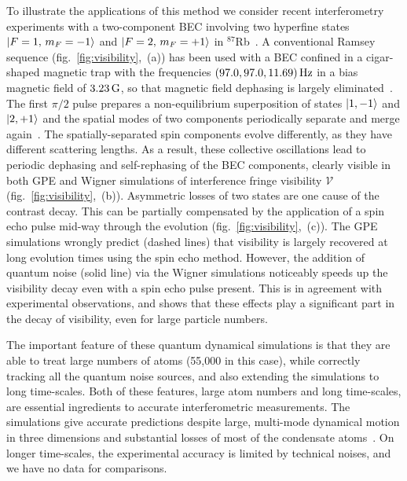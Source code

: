 \documentclass[doublecol]{epl2}
\newcommand{\Rb}{$^{87}$Rb}
\newcommand{\figref}[1]{fig.~\ref{#1}}
\newcommand{\ket}[1]{\mbox{\ensuremath{\vert #1 \rangle}}}
\begin{document}
To illustrate the applications of this method we consider recent interferometry
experiments with a two-component BEC involving two hyperfine states
${\ket{F=1,\, m_F=-1}}$ and ${\ket{F=2,\, m_F=+1}}$ in \Rb~\cite{Egorov2011}.
A conventional Ramsey sequence (\figref{fig:visibility},~(a)) has been used
with a BEC confined in a cigar-shaped magnetic trap with the frequencies $(97.0, 97.0, 11.69)\un{Hz}$
in a bias magnetic field of $3.23\un{G}$, so that magnetic field dephasing is largely eliminated~\cite{Hall1998}.
The first $\pi/2$ pulse prepares a non-equilibrium superposition of states ${\ket{1,-1}}$ and ${\ket{2,+1}}$
and the spatial modes of two components periodically separate and merge again~\cite{Mertes2007}.
The spatially-separated spin components evolve differently, as they have
different scattering lengths.
As a result, these collective oscillations lead to periodic dephasing and
self-rephasing of the BEC components, clearly visible in both GPE and Wigner
simulations of interference fringe visibility
$\mathcal{V}$ (\figref{fig:visibility},~(b)).
Asymmetric losses of two states are one cause of the contrast decay.
This can be partially compensated by the application of a spin echo pulse
mid-way through the evolution (\figref{fig:visibility},~(c)).
The GPE simulations wrongly predict (dashed lines) that visibility is largely
recovered at long evolution times using the spin echo method.
However, the addition of quantum noise (solid line) via the Wigner simulations
noticeably speeds up the visibility decay even with a spin echo pulse present.
This is in agreement with experimental observations, and shows that these
effects play a significant part in the decay of visibility, even for
large particle numbers.

The important feature of these quantum dynamical simulations
is that they are able to treat large numbers of atoms (55,000 in this case),
while correctly tracking all the quantum noise sources, and also extending the simulations to long time-scales.
Both of these features, large atom numbers and long time-scales,
are essential ingredients to accurate interferometric measurements.
The simulations give accurate predictions despite large, multi-mode dynamical motion in three dimensions
and substantial losses of most of the condensate atoms~\cite{Egorov2011}.
On longer time-scales, the experimental accuracy is limited by technical noises, and we have no data for comparisons.
\end{document}
